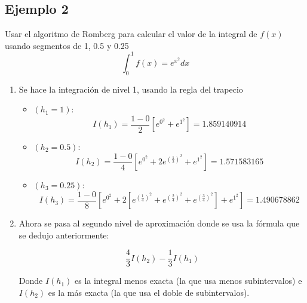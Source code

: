 \documentclass[journal,transmag]{IEEEtran}
\theoremstyle{mytheoremstyle}
\theoremstyle{mytheoremstyle}
\theoremstyle{myproblemstyle}
\begin{document}
    \subsection{Ejemplo 2}
    Usar el algoritmo de Romberg para calcular el valor de la integral de $f(x)$ usando segmentos de 1, 0.5 y 0.25 \\
    \begin{equation}
        \int_0^1 f(x)={e^{x^2}} dx
    \end{equation}
    \begin{enumerate}
    \item Se hace la integración de nivel 1, usando la regla del trapecio\\
        \begin{itemize}
            \item   $(h_1 = 1)$: \\
                \begin{equation}
                    I(h_1) = \frac{1-0}{2}[e^{0^2} + e^{1^2}] = 1.859140914
                \end{equation}
                \item   $(h_2 = 0.5)$: \\
                \begin{equation}
                    I(h_2) = \frac{1-0}{4}[e^{0^2} + 2e^{(\frac{1}{2})^2}+ e^{1^2}] = 1.571583165
                \end{equation}
                \item   $(h_3 = 0.25)$: \\
                \begin{equation}
                    I(h_3) = \frac{1-0}{8}[e^{0^2} + 2[e^{(\frac{1}{4})^2}+e^{(\frac{2}{4})^2}+e^{(\frac{3}{4})^2}] + e^{1^2}] = 1.490678862
                \end{equation}
        \end{itemize}
    \item   Ahora se pasa al segundo nivel de aproximación donde se usa la fórmula que se dedujo
    anteriormente:
    \begin{center}
        \begin{equation}
            \frac{4}{3}I(h_2)-\frac{1}{3}I(h_1)
        \end{equation}
    \end{center}

    Donde $I(h_1)$ es la integral menos exacta (la que usa menos subintervalos) e $I(h_2)$ es
    la más exacta (la que usa el doble de subintervalos). 


\end{enumerate}
\end{document}
